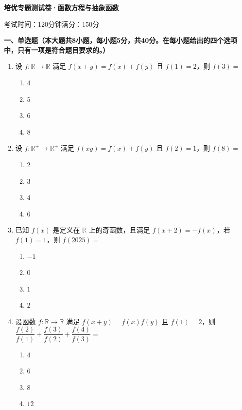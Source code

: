 \documentclass[12pt, a4paper]{ctexart}
\newcommand{\score}[1]{\hfill\makebox[2cm][l]{(#1分)}}
\begin{document}
\begin{center}
\Large\textbf{培优专题测试卷·函数方程与抽象函数}

\normalsize
考试时间：120分钟\quad 满分：150分
\end{center}

\vspace{0.5cm}

\noindent\textbf{一、单选题（本大题共8小题，每小题5分，共40分。在每小题给出的四个选项中，只有一项是符合题目要求的。）}

\vspace{0.3cm}

\begin{enumerate}
\item 设 $f: \mathbb{R} \to \mathbb{R}$ 满足 $f(x+y) = f(x) + f(y)$ 且 $f(1) = 2$，则 $f(3) = $\score{5}
\begin{enumerate}[label=\Alph*.]
\item $4$
\item $5$
\item $6$
\item $8$
\end{enumerate}

\item 设 $f: \mathbb{R}^+ \to \mathbb{R}^+$ 满足 $f(xy) = f(x) + f(y)$ 且 $f(2) = 1$，则 $f(8) = $\score{5}
\begin{enumerate}[label=\Alph*.]
\item $2$
\item $3$
\item $4$
\item $6$
\end{enumerate}

\item 已知 $f(x)$ 是定义在 $\mathbb{R}$ 上的奇函数，且满足 $f(x+2) = -f(x)$，若 $f(1) = 1$，则 $f(2025) = $\score{5}
\begin{enumerate}[label=\Alph*.]
\item $-1$
\item $0$
\item $1$
\item $2$
\end{enumerate}

\item 设函数 $f: \mathbb{R} \to \mathbb{R}$ 满足 $f(x+y) = f(x)f(y)$ 且 $f(1) = 2$，则 $\dfrac{f(2)}{f(1)} + \dfrac{f(3)}{f(2)} + \dfrac{f(4)}{f(3)} = $\score{5}
\begin{enumerate}[label=\Alph*.]
\item $4$
\item $6$
\item $8$
\item $12$
\end{enumerate}


\end{enumerate}
\end{document}
